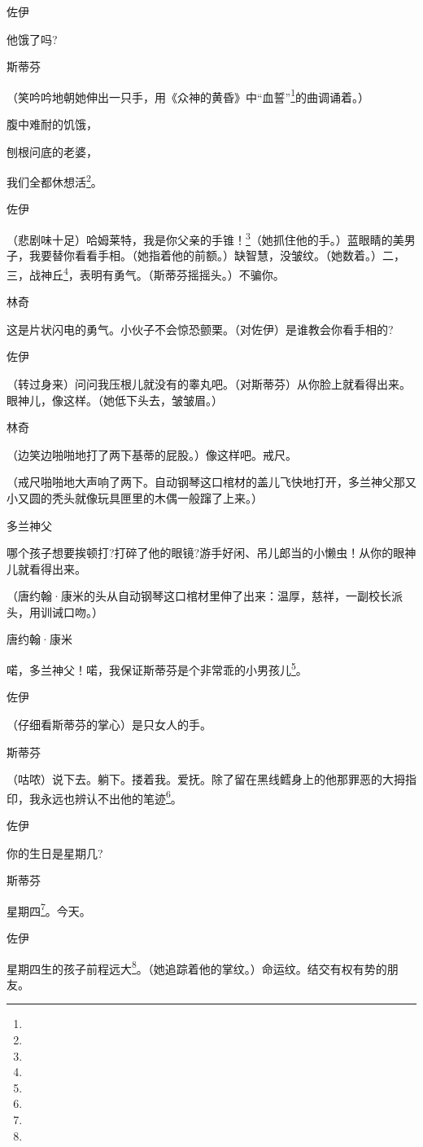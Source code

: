 \par 佐伊
\par 他饿了吗?
\par 斯蒂芬
\par （笑吟吟地朝她伸出一只手，用《众神的黄昏》中“血誓”\footnote{}的曲调诵着。）
\par 腹中难耐的饥饿，
\par 刨根问底的老婆，
\par 我们全都休想活\footnote{}。
\par 佐伊
\par （悲剧味十足）哈姆莱特，我是你父亲的手锥！\footnote{}（她抓住他的手。）蓝眼睛的美男子，我要替你看看手相。（她指着他的前额。）缺智慧，没皱纹。（她数着。）二，三，战神丘\footnote{}，表明有勇气。（斯蒂芬摇摇头。）不骗你。
\par 林奇
\par 这是片状闪电的勇气。小伙子不会惊恐颤栗。（对佐伊）是谁教会你看手相的?
\par 佐伊
\par （转过身来）问问我压根儿就没有的睾丸吧。（对斯蒂芬）从你脸上就看得出来。眼神儿，像这样。（她低下头去，皱皱眉。）
\par 林奇
\par （边笑边啪啪地打了两下基蒂的屁股。）像这样吧。戒尺。
\par （戒尺啪啪地大声响了两下。自动钢琴这口棺材的盖儿飞快地打开，多兰神父那又小又圆的秃头就像玩具匣里的木偶一般蹿了上来。）
\par 多兰神父
\par 哪个孩子想要挨顿打?打碎了他的眼镜?游手好闲、吊儿郎当的小懒虫！从你的眼神儿就看得出来。
\par （唐约翰·康米的头从自动钢琴这口棺材里伸了出来：温厚，慈祥，一副校长派头，用训诫口吻。）
\par 唐约翰·康米
\par 喏，多兰神父！喏，我保证斯蒂芬是个非常乖的小男孩儿\footnote{}。
\par 佐伊
\par （仔细看斯蒂芬的掌心）是只女人的手。
\par 斯蒂芬
\par （咕哝）说下去。躺下。搂着我。爱抚。除了留在黑线鳕身上的他那罪恶的大拇指印，我永远也辨认不出他的笔迹\footnote{}。
\par 佐伊
\par 你的生日是星期几?
\par 斯蒂芬
\par 星期四\footnote{}。今天。
\par 佐伊
\par 星期四生的孩子前程远大\footnote{}。（她追踪着他的掌纹。）命运纹。结交有权有势的朋友。
